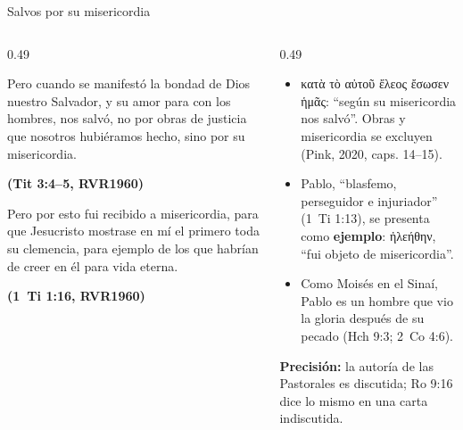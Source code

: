 \documentclass[hyperref={bookmarks=false},aspectratio=169]{beamer}
\newcommand{\grc}[1]{\foreignlanguage{ancientgreek}{#1}}
\newcommand{\fuente}[1]{\par\hfill{\upshape\bfseries\footnotesize\textcolor{azul}{#1}}}
\newcommand{\destacar}[1]{\textbf{\textcolor{azul}{#1}}}
\newcommand{\precision}[1]{{\footnotesize\color{gris}\textbf{Precisión:} #1}}
\begin{document}
\begin{frame}{Salvos por su misericordia}
\begin{columns}[t,onlytextwidth]
\begin{column}{0.49\textwidth}
\begin{cita}Pero cuando se manifestó la bondad de Dios nuestro Salvador, y su amor para con los hombres, nos salvó, no por obras de justicia que nosotros hubiéramos hecho, sino por su misericordia.\fuente{(Tit 3:4--5, RVR1960)}\end{cita}
\begin{cita}Pero por esto fui recibido a misericordia, para que Jesucristo mostrase en mí el primero toda su clemencia, para ejemplo de los que habrían de creer en él para vida eterna.\fuente{(1~Ti 1:16, RVR1960)}\end{cita}
\end{column}
\begin{column}{0.49\textwidth}\small
\begin{itemize}
\item \grc{κατὰ τὸ αὐτοῦ ἔλεος ἔσωσεν ἡμᾶς}: ``según su misericordia nos salvó''. Obras y misericordia se excluyen (Pink, 2020, caps. 14--15).
\item Pablo, ``blasfemo, perseguidor e injuriador'' (1~Ti 1:13), se presenta como \destacar{ejemplo}: \grc{ἠλεήθην}, ``fui objeto de misericordia''.
\item Como Moisés en el Sinaí, Pablo es un hombre que vio la gloria después de su pecado (Hch 9:3; 2~Co 4:6).
\end{itemize}
\precision{la autoría de las Pastorales es discutida; Ro 9:16 dice lo mismo en una carta indiscutida.}
\end{column}
\end{columns}
\end{frame}
\end{document}
